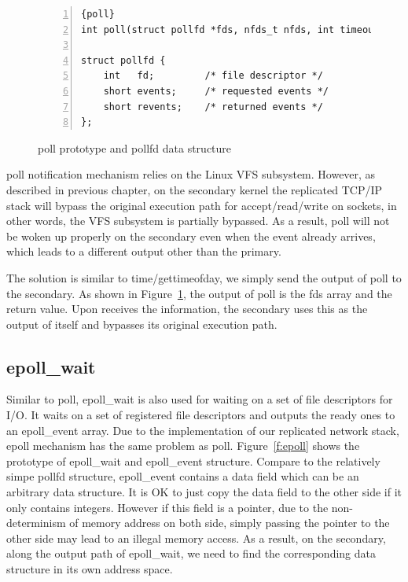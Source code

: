 \begin{figure}
\begin{lstlisting}[numbers=left, frame=single, basicstyle=\small, breaklines]{poll}
int poll(struct pollfd *fds, nfds_t nfds, int timeout);

struct pollfd {
    int   fd;         /* file descriptor */
    short events;     /* requested events */
    short revents;    /* returned events */
};
\end{lstlisting}
\caption{poll prototype and pollfd data structure}
\label{f:pollfd}
\end{figure}

poll notification mechanism relies on the Linux VFS subsystem. However, as described in previous chapter, on the secondary kernel the replicated TCP/IP stack will bypass the original execution path for accept/read/write on sockets, in other words, the VFS subsystem is partially bypassed. As a result, poll will not be woken up properly on the secondary even when the event already arrives, which leads to a different output other than the primary.

The solution is similar to time/gettimeofday, we simply send the output of poll to the secondary. As shown in Figure~\ref{f:pollfd}, the output of poll is the fds array and the return value. Upon receives the information, the secondary uses this as the output of itself and bypasses its original execution path.

\subsection{epoll\_wait}
Similar to poll, epoll\_wait is also used for waiting on a set of file descriptors for I/O. It waits on a set of registered file descriptors and outputs the ready ones to an epoll\_event array. Due to the implementation of our replicated network stack, epoll mechanism has the same problem as poll. Figure~\ref{f:epoll} shows the prototype of epoll\_wait and epoll\_event structure. Compare to the relatively simpe pollfd structure, epoll\_event contains a data field which can be an arbitrary data structure. It is OK to just copy the data field to the other side if it only contains integers. However if this field is a pointer, due to the non-determinism of memory address on both side, simply passing the pointer to the other side may lead to an illegal memory access. As a result, on the secondary, along the output path of epoll\_wait, we need to find the corresponding data structure in its own address space.


